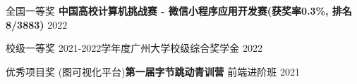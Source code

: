 

\begin{cvhonors}

    \cvhonor
    {全国一等奖} %
    {\textbf{中国高校计算机挑战赛 - 微信小程序应用开发赛(获奖率0.3\%, 排名8/3883)}} %
    {} %
    {2022} %

    \cvhonor
    {校级一等奖} %
    {2021-2022学年度广州大学校级综合奖学金} %
    {} %
    {2022} %

    \cvhonor
    {优秀项目奖} %
    {(图可视化平台)\textbf{第一届字节跳动青训营} 前端进阶班} %
    {} %
    {2021} %


\end{cvhonors}
